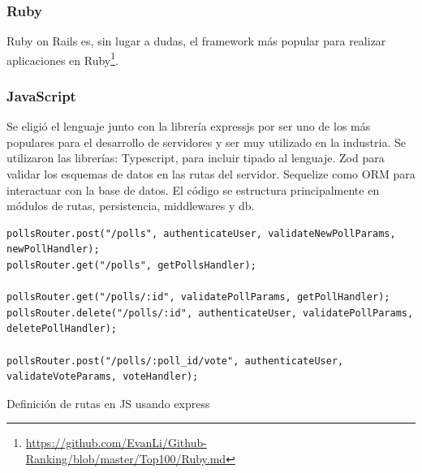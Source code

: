 \documentclass[11pt]{article}
\let\Oldsubsubsection\subsubsection
\renewcommand{\subsubsection}{\FloatBarrier\Oldsubsubsection}
\begin{document}
\subsubsection{Ruby}

Ruby on Rails es, sin lugar a dudas, el framework más popular para realizar aplicaciones en Ruby\footnote{\url{https://github.com/EvanLi/Github-Ranking/blob/master/Top100/Ruby.md}}. %

\subsubsection{JavaScript}

Se eligió el lenguaje junto con la librería expressjs por ser uno de los más populares para el desarrollo de servidores y ser muy utilizado en la industria.
Se utilizaron las librerías: Typescript, para incluir tipado al lenguaje. Zod para validar los esquemas de datos en las rutas del servidor. Sequelize como ORM para interactuar con la base de datos.
El código se estructura principalmente en módulos de rutas, persistencia, middlewares y db.

\begin{listing}
\begin{verbatim}
pollsRouter.post("/polls", authenticateUser, validateNewPollParams, newPollHandler);
pollsRouter.get("/polls", getPollsHandler);

pollsRouter.get("/polls/:id", validatePollParams, getPollHandler);
pollsRouter.delete("/polls/:id", authenticateUser, validatePollParams, deletePollHandler);

pollsRouter.post("/polls/:poll_id/vote", authenticateUser, validateVoteParams, voteHandler);
\end{verbatim}
\caption{Definición de rutas en JS usando express}
\label{code:http_js_routes}
\end{listing}
\end{document}
